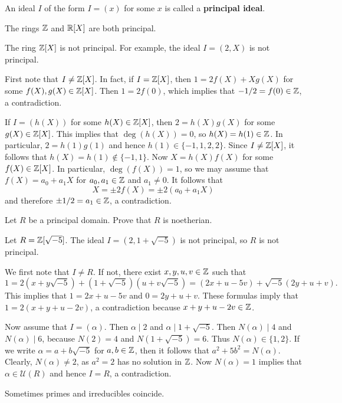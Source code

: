 An ideal $I$ of the form $I=(x)$ for some $x$ is called a \textbf{principal ideal}. 

The rings $\mathbb{Z}$ and $\mathbb{R}[X]$ are both principal. 

\begin{example}
	The ring $\mathbb{Z}[X]$ is not principal. For example, the ideal
	$I=(2,X)$ is not principal. 
	
	First note that $I\ne\mathbb{Z}[X]$. In fact, if $I=\mathbb{Z}[X]$, then 
	$1=2f(X)+Xg(X)$ for some $f(X),g(X)\in\mathbb{Z}[X]$. Then 
	$1=2f(0)$, which implies that $-1/2=f(0)\in\mathbb{Z}$, a contradiction. 
	
	If $I=(h(X))$ for some $h(X)\in\mathbb{Z}[X]$, then $2=h(X)g(X)$ for some $g(X)\in\mathbb{Z}[X]$. This
	implies that $\deg(h(X))=0$, so $h(X)=h(1)\in\mathbb{Z}$. In particular, $2=h(1)g(1)$ and hence
	$h(1)\in\{-1,1,2,2\}$. Since $I\ne\mathbb{Z}[X]$, it follows that $h(X)=h(1)\not\in\{-1,1\}$. Now      
	$X=h(X)f(X)$ for some $f(X)\in\mathbb{Z}[X]$. In particular, $\deg(f(X))=1$, so
	we may assume that $f(X)=a_0+a_1X$ for $a_0,a_1\in\mathbb{Z}$ and $a_1\ne 0$. 	
	It follows that 
	\[
	X=\pm 2f(X)=\pm2(a_0+a_1X)
	\]
	and therefore $\pm1/2=a_1\in\mathbb{Z}$, a contradiction.
\end{example}

\begin{exercise}
\label{xca:principal=>noetherian}
    Let $R$ be a principal domain. Prove that $R$ is noetherian.
\end{exercise}

\begin{example}
	Let $R=\mathbb{Z}[\sqrt{-5}]$.  
	The ideal $I=(2,1+\sqrt{-5})$ is not principal, so $R$ is not principal. 
	
	We first note that $I\ne R$. If not, there exist $x,y,u,v\in\mathbb{Z}$ such that 
	\[
	1=2(x+y\sqrt{-5})+(1+\sqrt{-5})(u+v\sqrt{-5})=(2x+u-5v)+\sqrt{-5}(2y+u+v).
	\]
	This implies that $1=2x+u-5v$ and $0=2y+u+v$. These formulas imply that
	$1=2(x+y+u-2v)$, a contradiction because $x+y+u-2v\in\mathbb{Z}$. 
	
	Now assume that $I=(\alpha)$. Then $\alpha\mid 2$ and $\alpha\mid 1+\sqrt{-5}$. Then
	$N(\alpha)\mid 4$ and $N(\alpha)\mid 6$, because $N(2)=4$ and $N(1+\sqrt{-5})=6$. 
	Thus $N(\alpha)\in\{1,2\}$. If we write
	$\alpha=a+b\sqrt{-5}$ for $a,b\in\mathbb{Z}$, then it follows that 
	$a^2+5b^2=N(\alpha)$. Clearly, $N(\alpha)\ne 2$, as $a^2=2$ has no solution in $\mathbb{Z}$.
	Now $N(\alpha)= 1$ implies that $\alpha\in\mathcal{U}(R)$ and hence 
	$I=R$, a contradiction.   
\end{example}

Sometimes primes and irreducibles coincide. 

